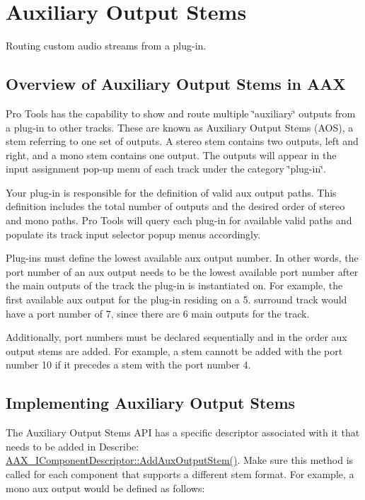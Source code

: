 \hypertarget{a00809}{}\section{Auxiliary Output Stems}
\label{a00809}
Routing custom audio streams from a plug-\/in. 

\hypertarget{a00809_additionalFeatures_AOS_overview}{}\subsection{Overview of Auxiliary Output Stems in A\+AX}\label{a00809_additionalFeatures_AOS_overview}
Pro Tools has the capability to show and route multiple \char`\"{}auxiliary\char`\"{} outputs from a plug-\/in to other tracks. These are known as Auxiliary Output Stems (A\+OS), a stem referring to one set of outputs. A stereo stem contains two outputs, left and right, and a mono stem contains one output. The outputs will appear in the input assignment pop-\/up menu of each track under the category \char`\"{}plug-\/in\char`\"{}.

Your plug-\/in is responsible for the definition of valid aux output paths. This definition includes the total number of outputs and the desired order of stereo and mono paths. Pro Tools will query each plug-\/in for available valid paths and populate its track input selector popup menus accordingly.

Plug-\/ins must define the lowest available aux output number. In other words, the port number of an aux output needs to be the lowest available port number after the main outputs of the track the plug-\/in is instantiated on. For example, the first available aux output for the plug-\/in residing on a 5. surround track would have a port number of 7, since there are 6 main outputs for the track.

Additionally, port numbers must be declared sequentially and in the order aux output stems are added. For example, a stem cannott be added with the port number 10 if it precedes a stem with the port number 4.\hypertarget{a00809_additionalFeatures_AOS_adding}{}\subsection{Implementing Auxiliary Output Stems}\label{a00809_additionalFeatures_AOS_adding}
The Auxiliary Output Stems A\+PI has a specific descriptor associated with it that needs to be added in Describe\+: \mbox{\hyperlink{a01781_a76266e8a07ce20cdbe5721172c32a93d}{A\+A\+X\+\_\+\+I\+Component\+Descriptor\+::\+Add\+Aux\+Output\+Stem()}}. Make sure this method is called for each component that supports a different stem format. For example, a mono aux output would be defined as follows\+:


